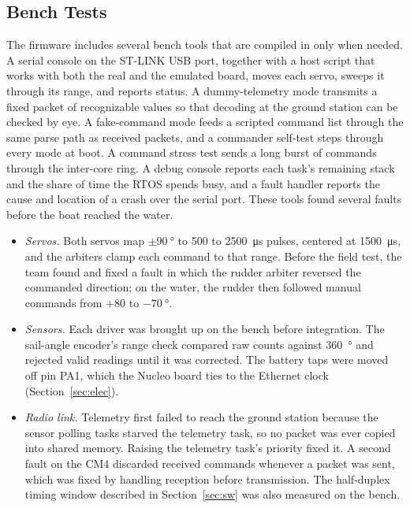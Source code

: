 \subsection{Bench Tests}
The firmware includes several bench tools that are compiled in only when
needed. A serial console on the ST-LINK USB port, together with a host script
that works with both the real and the emulated board, moves each servo, sweeps
it through its range, and reports status. A dummy-telemetry mode transmits a
fixed packet of recognizable values so that decoding at the ground station
can be checked by eye. A fake-command mode feeds a scripted command list
through the same parse path as received packets, and a commander self-test
steps through every mode at boot. A command stress test sends a long burst
of commands through the inter-core ring. A debug console reports each task's
remaining stack and the share of time the RTOS spends busy, and a fault handler
reports the cause and location of a crash over the serial port. These tools found several faults before the boat reached the water.
\begin{itemize}
\item \emph{Servos.} Both servos map $\pm\SI{90}{\degree}$ to 500 to
\SI{2500}{\micro\second} pulses, centered at \SI{1500}{\micro\second}, and
the arbiters clamp each command to that range. Before the field test, the
team found and fixed a fault in which the rudder arbiter reversed the
commanded direction; on the water, the rudder then followed manual commands
from $+80$ to $-\SI{70}{\degree}$.
\item \emph{Sensors.} Each driver was brought up on the bench before
integration. The sail-angle encoder's range check compared raw counts
against \SI{360}{\degree} and rejected valid readings until it was
corrected. The battery taps were moved off pin PA1, which the Nucleo
board ties to the Ethernet clock (Section~\ref{sec:elec}).
\item \emph{Radio link.} Telemetry first failed to reach the ground
station because the sensor polling tasks starved the telemetry task, so no
packet was ever copied into shared memory. Raising the telemetry task's
priority fixed it. A second fault on the CM4 discarded received commands
whenever a packet was sent, which was fixed by handling reception before
transmission. The half-duplex timing window described in
Section~\ref{sec:sw} was also measured on the bench.
\end{itemize}

